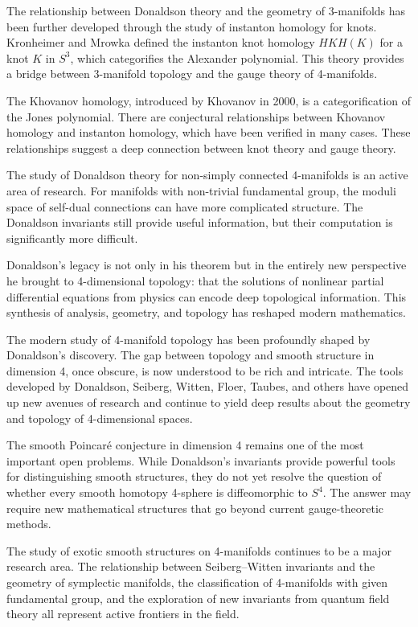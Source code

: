 The relationship between Donaldson theory and the geometry of 3-manifolds has been further developed through the study of instanton homology for knots. Kronheimer and Mrowka defined the instanton knot homology $HKH(K)$ for a knot $K$ in $S^3$, which categorifies the Alexander polynomial. This theory provides a bridge between 3-manifold topology and the gauge theory of 4-manifolds.

The Khovanov homology, introduced by Khovanov in 2000, is a categorification of the Jones polynomial. There are conjectural relationships between Khovanov homology and instanton homology, which have been verified in many cases. These relationships suggest a deep connection between knot theory and gauge theory.

The study of Donaldson theory for non-simply connected 4-manifolds is an active area of research. For manifolds with non-trivial fundamental group, the moduli space of self-dual connections can have more complicated structure. The Donaldson invariants still provide useful information, but their computation is significantly more difficult.

Donaldson's legacy is not only in his theorem but in the entirely new perspective he brought to 4-dimensional topology: that the solutions of nonlinear partial differential equations from physics can encode deep topological information. This synthesis of analysis, geometry, and topology has reshaped modern mathematics.

The modern study of 4-manifold topology has been profoundly shaped by Donaldson's discovery. The gap between topology and smooth structure in dimension 4, once obscure, is now understood to be rich and intricate. The tools developed by Donaldson, Seiberg, Witten, Floer, Taubes, and others have opened up new avenues of research and continue to yield deep results about the geometry and topology of 4-dimensional spaces.

The smooth Poincaré conjecture in dimension 4 remains one of the most important open problems. While Donaldson's invariants provide powerful tools for distinguishing smooth structures, they do not yet resolve the question of whether every smooth homotopy 4-sphere is diffeomorphic to $S^4$. The answer may require new mathematical structures that go beyond current gauge-theoretic methods.

The study of exotic smooth structures on 4-manifolds continues to be a major research area. The relationship between Seiberg--Witten invariants and the geometry of symplectic manifolds, the classification of 4-manifolds with given fundamental group, and the exploration of new invariants from quantum field theory all represent active frontiers in the field.

